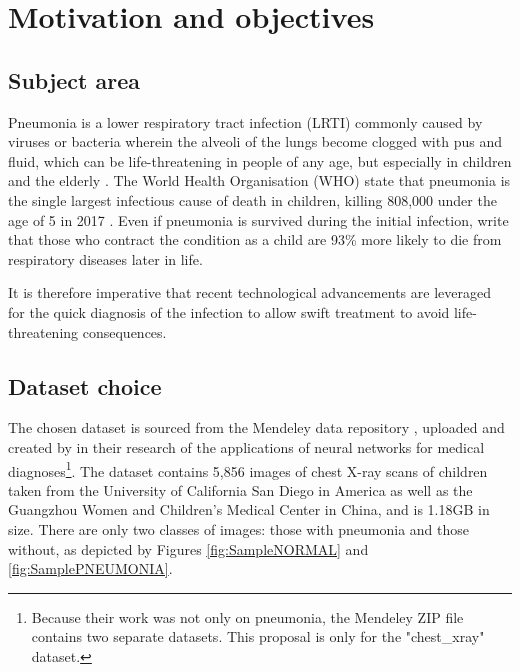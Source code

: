 \documentclass[12pt]{report}
\newcommand{\para}{\vspace{7pt}\noindent}
\begin{document}


\chapter{Motivation and objectives}

\section{Subject area}

Pneumonia is a lower respiratory tract infection (LRTI) commonly caused by viruses or bacteria wherein the alveoli of the lungs 
become clogged with pus and fluid, which can be life-threatening in people of any age, but especially in children and the elderly
\autocite{nhsPneumonia2017}. The World Health Organisation (WHO) state that pneumonia is the single largest infectious cause of death 
in children, killing 808,000 under the age of 5 in 2017 \autocite{whoPneumonia}. Even if pneumonia is survived during the initial infection,
\textcite{allinsonEarlyChildhoodLower2023} write that those who contract the condition as a child are 93\% more likely to die from respiratory
diseases later in life.

\para It is therefore imperative that recent technological advancements are leveraged for the quick diagnosis of the infection to allow swift 
treatment to avoid life-threatening consequences. 

\section{Dataset choice}
The chosen dataset is sourced from the Mendeley data repository \autocite{mendeleydataLargeDatasetLabeled}, uploaded and created by  
\textcite[p.1127]{kermanyIdentifyingMedicalDiagnoses2018} in their research of the applications of neural networks for medical diagnoses\footnote{Because their work was not only on pneumonia, the Mendeley ZIP file contains two separate datasets. This proposal is only for the "chest\_xray" dataset.}. 
The dataset contains 5,856 images of chest X-ray scans of children taken from the University of California San Diego in America as well as the
Guangzhou Women and Children's Medical Center in China, and is 1.18GB in size. There are only two classes of images: those with 
pneumonia and those without, as depicted by Figures \ref{fig:SampleNORMAL} and \ref{fig:SamplePNEUMONIA}.
\end{document}
